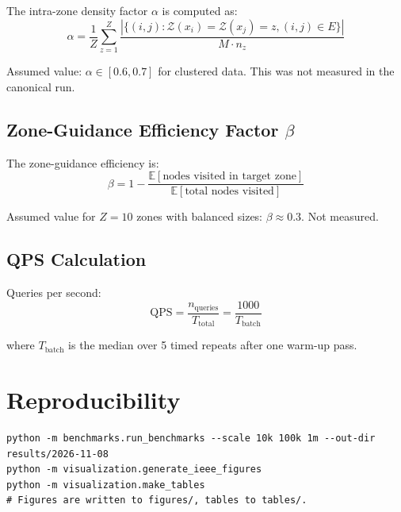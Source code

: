 \documentclass[11pt,a4paper]{article}
\newcommand{\qps}{\text{QPS}}
\begin{document}
The intra-zone density factor $\alpha$ is computed as:
\[
\alpha = \frac{1}{Z} \sum_{z=1}^{Z} \frac{|\{(i,j) : \mathcal{Z}(x_i) = \mathcal{Z}(x_j) = z, (i,j) \in E\}|}{M \cdot n_z}
\]

Assumed value: $\alpha \in [0.6, 0.7]$ for clustered data. This was not measured in the canonical run.

\subsection{Zone-Guidance Efficiency Factor $\beta$}

The zone-guidance efficiency is:
\[
\beta = 1 - \frac{\mathbb{E}[\text{nodes visited in target zone}]}{\mathbb{E}[\text{total nodes visited}]}
\]

Assumed value for $Z = 10$ zones with balanced sizes: $\beta \approx 0.3$. Not measured.

\subsection{QPS Calculation}

Queries per second:
\[
\qps = \frac{n_{\text{queries}}}{T_{\text{total}}} = \frac{1000}{T_{\text{batch}}}
\]

where $T_{\text{batch}}$ is the median over 5 timed repeats after one warm-up pass.

\section{Reproducibility}

\begin{verbatim}
python -m benchmarks.run_benchmarks --scale 10k 100k 1m --out-dir results/2026-11-08
python -m visualization.generate_ieee_figures
python -m visualization.make_tables
# Figures are written to figures/, tables to tables/.
\end{verbatim}
\end{document}
